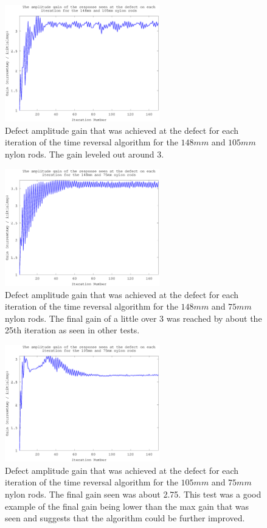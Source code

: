  \begin{figure}[ht!]
 \centering
 \includegraphics[width=0.6\textwidth]{eps_pics/nylon-2-3_iterationVsGain.eps}
 \caption{Defect amplitude gain that was achieved at the defect for each iteration of the time reversal algorithm for the $148 mm$ and $105 mm$ nylon rods. The gain leveled out around 3.
 	 \label{fig:nylonIter1}} 
 \end{figure}
   
 \begin{figure}[ht!]
 \centering
 \includegraphics[width=0.6\textwidth]{eps_pics/nylon-2-4_iterationVsGain.eps}
 \caption{Defect amplitude gain that was achieved at the defect for each iteration of the time reversal algorithm for the $148 mm$ and $75 mm$ nylon rods. The final gain of a little over 3 was reached by about the 25th iteration as seen in other tests.
  	 \label{fig:nylonIter2}} 
 \end{figure}
 
 \begin{figure}[ht!]
 \centering
 \includegraphics[width=0.6\textwidth]{eps_pics/nylon-3-4_iterationVsGain.eps}
 \caption{Defect amplitude gain that was achieved at the defect for each iteration of the time reversal algorithm for the $105 mm$ and $75 mm$ nylon rods. The final gain seen was about 2.75. This test was a good example of the final gain being lower than the max gain that was seen and suggests that the algorithm could be further improved.
  	 \label{fig:nylonIter3}} 
 \end{figure}
 
